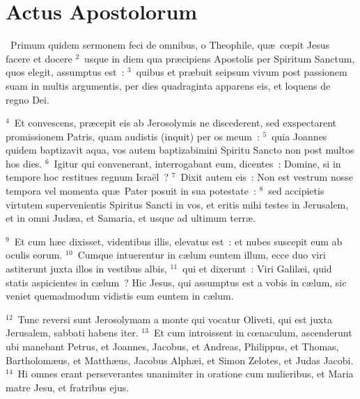 {\centering \section*{Actus Apostolorum}}\thispagestyle{empty}

~Primum quidem sermonem feci de omnibus, o Theophile, qu\ae\ cœpit Jesus facere et docere
${}^{2}$~usque in diem qua pr\ae cipiens Apostolis per Spiritum Sanctum, quos elegit, assumptus est~:
${}^{3}$~quibus et pr\ae buit seipsum vivum post passionem suam in multis argumentis, per dies quadraginta apparens eis, et loquens de regno Dei.


${}^{4}$~Et convescens, pr\ae cepit eis ab Jerosolymis ne discederent, sed exspectarent promissionem Patris, quam audistis (inquit) per os meum~:
${}^{5}$~quia Joannes quidem baptizavit aqua, vos autem baptizabimini Spiritu Sancto non post multos hos dies.
${}^{6}$~Igitur qui convenerant, interrogabant eum, dicentes~: Domine, si in tempore hoc restitues regnum Isra\"el~?
${}^{7}$~Dixit autem eis~: Non est vestrum nosse tempora vel momenta qu\ae\ Pater posuit in sua potestate~:
${}^{8}$~sed accipietis virtutem supervenientis Spiritus Sancti in vos, et eritis mihi testes in Jerusalem, et in omni Jud\ae a, et Samaria, et usque ad ultimum terr\ae .


${}^{9}$~Et cum h\ae c dixisset, videntibus illis, elevatus est~: et nubes suscepit eum ab oculis eorum.
${}^{10}$~Cumque intuerentur in c\ae lum euntem illum, ecce duo viri astiterunt juxta illos in vestibus albis,
${}^{11}$~qui et dixerunt~: Viri Galil\ae i, quid statis aspicientes in c\ae lum~? Hic Jesus, qui assumptus est a vobis in c\ae lum, sic veniet quemadmodum vidistis eum euntem in c\ae lum.


${}^{12}$~Tunc reversi sunt Jerosolymam a monte qui vocatur Oliveti, qui est juxta Jerusalem, sabbati habens iter.
${}^{13}$~Et cum introissent in cœnaculum, ascenderunt ubi manebant Petrus, et Joannes, Jacobus, et Andreas, Philippus, et Thomas, Bartholom\ae us, et Matth\ae us, Jacobus Alph\ae i, et Simon Zelotes, et Judas Jacobi.
${}^{14}$~Hi omnes erant perseverantes unanimiter in oratione cum mulieribus, et Maria matre Jesu, et fratribus ejus.


